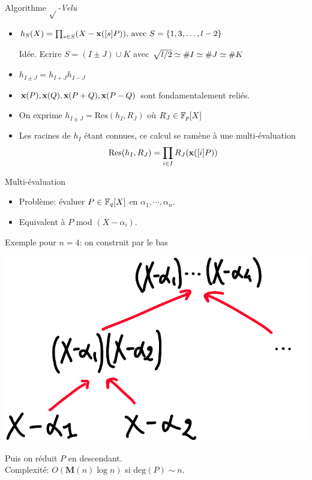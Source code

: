 \documentclass{beamer}
\begin{document}
\begin{frame}[fragile]{Algorithme $\sqrt{}$\textit{-Velu}}
	\begin{itemize}
		\item{$h_S(X) = \prod_{s\in S}(X-\textbf{x}([s]P))\text{, avec }S=\{1,3, \ldots, \mathnormal{l}-2\}$}
		\item[Idée.] {Ecrire $S=(I\pm J) \cup K$} avec $\sqrt{\mathnormal{l}/2}\simeq \#I \simeq \#J \simeq \#K$
		\item{$h_{I\pm J} = h_{I+J} h_{I-J}$}
		\item{$\textbf{x}(P), \textbf{x}(Q), \textbf{x}(P+Q), \textbf{x}(P-Q)$ sont fondamentalement reliés.}
		\item{On exprime $h_{I\pm J}=\text{Res}(h_I, R_J)$ où $R_J\in\mathbb{F}_p[X]$}
		\item{Les racines de $h_I$ étant connues, ce calcul se ramène à une multi-évaluation
			\[\text{Res}(h_I, R_J)=\prod_{i\in I}R_J(\textbf{x}([i]P))\]}
	\end{itemize}
\end{frame}

\begin{frame}{Multi-\'evaluation}
	\begin{itemize}
		\item Probl\`eme:  \'evaluer $P\in\mathbb{F}_q[X]$ en $\alpha_1,\cdots, \alpha_n$.
		\item Equivalent \`a $P$ mod $(X-\alpha_i)$.
	\end{itemize}
	Exemple pour $n=4$: on construit par le bas
	\begin{center}
		\includegraphics[scale=0.2]{../figs/tree}
	\end{center}
	Puis on r\'eduit $P$ en descendant.\\
	Complexit\'e: $O(\mathbf{M}(n)\log n)$ si $\text{deg}(P) \sim n$.
\end{frame}
\end{document}
